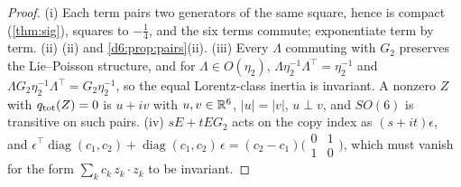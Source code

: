 \begin{proof}
(i) Each term pairs two generators of the same square, hence is compact (\cref{thm:sig}), squares to $-\tfrac14$, and the six terms
commute; exponentiate term by term. (ii) (ii) and \cref{d6:prop:pairs}(ii). (iii) Every $\Lambda$ commuting with $G_2$
preserves the Lie--Poisson structure, and for $\Lambda\in O(\eta_2)$, $\Lambda\eta_2^{-1}\Lambda^{\!\top}=\eta_2^{-1}$ and
$\Lambda G_2\eta_2^{-1}\Lambda^{\!\top}=G_2\eta_2^{-1}$, so the equal Lorentz-class inertia is invariant. A nonzero $Z$ with $q_{\rm tot}(Z)=0$ is $u+iv$
with $u,v\in\mathbb{R}^6$, $|u|=|v|$, $u\perp v$, and $SO(6)$ is transitive on such pairs. (iv) $sE+tEG_2$ acts on the copy index as $(s+it)\epsilon$, and
$\epsilon^{\!\top}\operatorname{diag}(c_1,c_2)+\operatorname{diag}(c_1,c_2)\,\epsilon=(c_2-c_1)\bigl(\begin{smallmatrix}0&1\\1&0\end{smallmatrix}\bigr)$, which must vanish for the form $\sum_kc_k\,z_k\cdot z_k$ to be invariant.
\end{proof}

